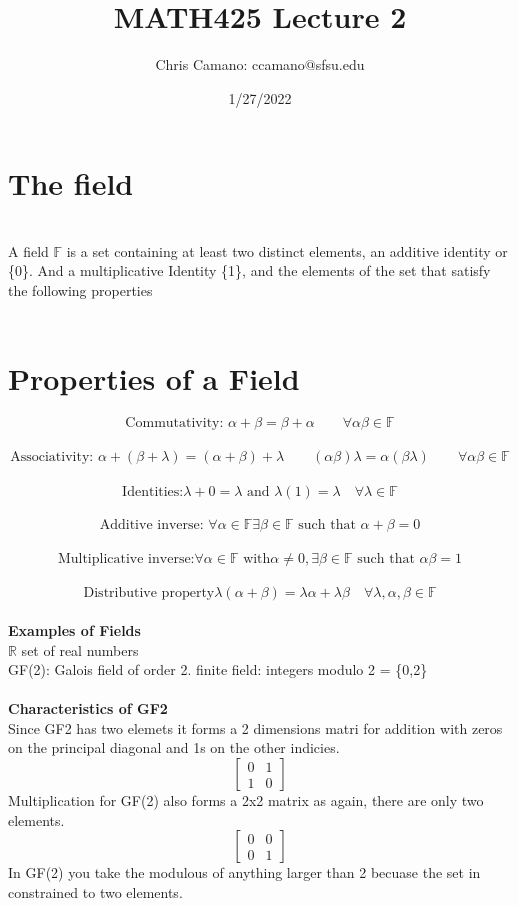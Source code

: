 \documentclass[12pt,a4paper]{article}
\author{Chris Camano: ccamano@sfsu.edu}
\title{MATH425 Lecture 2}
\date{1/27/2022}
\begin{document}
\maketitle
\section{The field}\\
A field $\mathbb{F}$ is a set containing at least two distinct elements, an additive identity or \{0\}. And a multiplicative Identity \{1\}, and the elements of the set that satisfy the following properties \\\\
\section{Properties of a Field}
$$
  \text{Commutativity:  } \alpha + \beta = \beta + \alpha\qquad  \forall \alpha\beta \in \mathbb{F} $$
  \\
  $$\text{Associativity:  } \alpha + (\beta+\lambda) = (\alpha + \beta)+\lambda\qquad (\alpha\beta)\lambda=\alpha(\beta\lambda)\qquad \forall \alpha\beta \in \mathbb{F} $$
  \\
  $$\text{Identities:} \lambda + 0 = \lambda \text{ and } \lambda(1)=\lambda \quad \forall \lambda \in \mathbb{F}$$
  \\
  $$\text{Additive inverse: } \forall \alpha \in \mathbb{F} \exists \beta \in \mathbb{F} \text{ such that } \alpha + \beta=0$$
  \\
  $$\text{Multiplicative inverse:} \forall \alpha \in \mathbb{F} \text{ with} \alpha \neq 0,\exists \beta \in \mathbb{F} \text{ such that } \alpha\beta=1$$
  \\
  $$\text{Distributive property} \lambda(\alpha+\beta)=\lambda\alpha +\lambda\beta \quad \forall \lambda,\alpha,\beta \in \mathbb{F}
$$
\\
\textbf{Examples of Fields}\\
$\mathbb{R}$ set of real numbers\\
GF(2): Galois field of order 2. finite field: integers modulo 2 = \{0,2\}
\\\\
\textbf{Characteristics of GF2}\\
Since GF2 has two elemets it forms a 2 dimensions matri for addition with zeros on the principal diagonal and 1s on the other indicies.\\
\[
 \begin{bmatrix}
0 & 1 \\
1 & 0
\end{bmatrix}
\]
Multiplication for GF(2) also forms a 2x2 matrix as again, there are only two elements.
$$ \begin{bmatrix}
0 & 0 \\
0 & 1
\end{bmatrix}  $$
In GF(2) you take the modulous of anything larger than 2 becuase the set in constrained to two elements. \\
\end{document}
